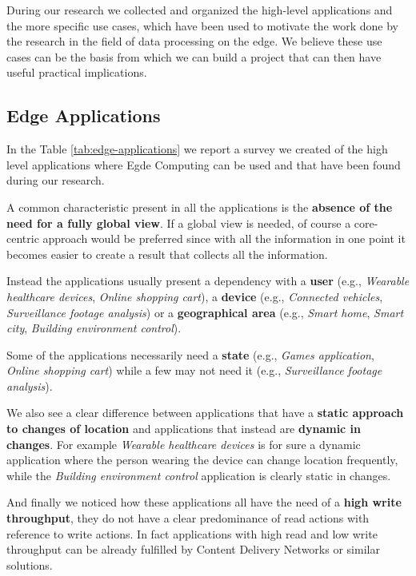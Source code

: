 During our research we collected and organized the high-level applications and the more specific use cases, which have been used to motivate the work done by the research in the field of data processing on the edge.
We believe these use cases can be the basis from which we can build a project that can then have useful practical implications.


\subsection{Edge Applications}
In the Table \ref{tab:edge-applications} we report a survey we created of the high level applications where Egde Computing can be used and that have been found during our research.

A common characteristic present in all the applications is the \textbf{absence of the need for a fully global view}. If a global view is needed, of course a core-centric approach would be preferred since with all the information in one point it becomes easier to create a result that collects all the information.

Instead the applications usually present a dependency with a \textbf{user} (e.g., \textit{Wearable healthcare devices}, \textit{Online shopping cart}), a \textbf{device} (e.g., \textit{Connected vehicles}, \textit{Surveillance footage analysis}) or a \textbf{geographical area} (e.g., \textit{Smart home}, \textit{Smart city}, \textit{Building environment control}).

Some of the applications necessarily need a \textbf{state} (e.g., \textit{Games application}, \textit{Online shopping cart}) while a few may not need it (e.g., \textit{Surveillance footage analysis}).

We also see a clear difference between applications that have a \textbf{static approach to changes of location} and applications that instead are \textbf{dynamic in changes}. For example \textit{Wearable healthcare devices} is for sure a dynamic application where the person wearing the device can change location frequently, while the \textit{Building environment control} application is clearly static in changes.

And finally we noticed how these applications all have the need of a \textbf{high write throughput}, they do not have a clear predominance of read actions with reference to write actions. In fact applications with high read and low write throughput can be already fulfilled by Content Delivery Networks or similar solutions.

